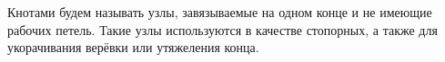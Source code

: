 
Кнотами будем называть узлы, завязываемые на одном конце и не имеющие рабочих петель. Такие узлы используются в качестве стопорных, а также для укорачивания верёвки или утяжеления конца.
